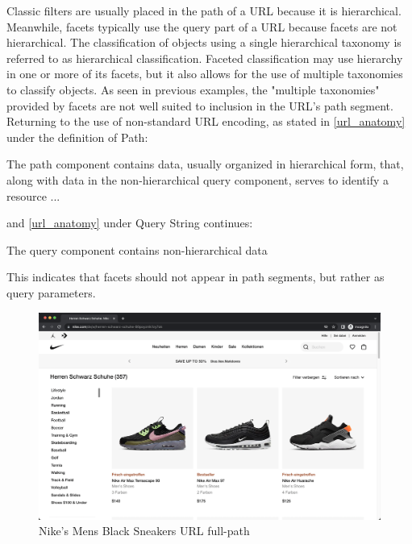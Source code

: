 Classic filters are usually placed in the path of a URL because it is hierarchical. Meanwhile, facets typically use the query part of a URL because facets are not hierarchical. The classification of objects using a single hierarchical taxonomy is referred to as hierarchical classification. Faceted classification may use hierarchy in one or more of its facets, but it also allows for the use of multiple taxonomies to classify objects. As seen in previous examples, the "multiple taxonomies" provided by facets are not well suited to inclusion in the URL's path segment. Returning to the use of non-standard URL encoding, as stated in \autoref{url_anatomy} under the definition of Path:

\begin{displayquote}
  The path component contains data, usually organized in hierarchical form, that, along with data in the non-hierarchical query component, serves to identify a resource ...
\end{displayquote}

\noindent and \autoref{url_anatomy} under Query String continues:

\begin{displayquote}
  The query component contains non-hierarchical data
\end{displayquote}

\noindent This indicates that facets should not appear in path segments, but rather as query parameters.

\begin{figure}[H]
  \includegraphics[width=\textwidth]{assets/Nike_Screenshot_2022-08-11_at_11.49.33.png}
  \caption{Nike's Mens Black Sneakers URL full-path}
  \label{fig:nikeMensBlackSneakersUrl}
\end{figure}

